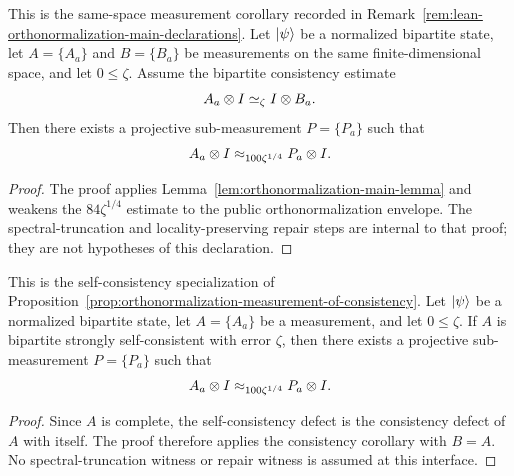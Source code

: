 \begin{proposition}\label{prop:orthonormalization-measurement-of-consistency}
	\leanok
	This is the same-space measurement corollary recorded in
	Remark~\ref{rem:lean-orthonormalization-main-declarations}.  Let
	\(\lvert \psi \rangle\) be a normalized bipartite state, let \(A=\{A_a\}\) and
	\(B=\{B_a\}\) be measurements on the same finite-dimensional space, and
	let \(0 \leq \zeta\).  Assume the bipartite consistency estimate
	\[
		A_a \otimes I \simeq_{\zeta} I \otimes B_a .
	\]
	Then there exists a projective sub-measurement \(P=\{P_a\}\) such that
	\[
		A_a \otimes I \approx_{100\zeta^{1/4}} P_a \otimes I .
	\]
\end{proposition}
\begin{proof}
	\leanok
	The proof applies Lemma~\ref{lem:orthonormalization-main-lemma} and weakens
	the \(84\zeta^{1/4}\) estimate to the public orthonormalization envelope.
	The spectral-truncation and locality-preserving repair steps are internal to
	that proof; they are not hypotheses of this declaration.
\end{proof}

\begin{proposition}\label{prop:orthonormalization-measurement}
	\leanok
	This is the self-consistency specialization of
	Proposition~\ref{prop:orthonormalization-measurement-of-consistency}.
	Let \(\lvert \psi \rangle\) be a normalized bipartite state, let \(A=\{A_a\}\) be a
	measurement, and let \(0\leq\zeta\).  If \(A\) is bipartite strongly
	self-consistent with error \(\zeta\), then there exists a projective
	sub-measurement \(P=\{P_a\}\) such that
	\[
		A_a \otimes I \approx_{100 \zeta^{1/4}} P_a \otimes I.
	\]
\end{proposition}
\begin{proof}
	\leanok
	Since \(A\) is complete, the self-consistency defect is the consistency
	defect of \(A\) with itself.  The proof therefore applies the consistency
	corollary with \(B=A\).  No spectral-truncation witness or repair witness is
	assumed at this interface.
\end{proof}

